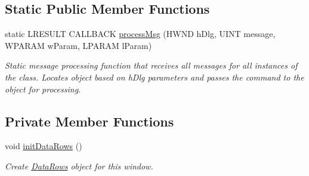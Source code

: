 \subsection*{Static Public Member Functions}
\begin{DoxyCompactItemize}
\item 
static LRESULT CALLBACK \hyperlink{class_raw_data_dialog_a3f6714a823c63a968366ddefc521daab}{processMsg} (HWND hDlg, UINT message, WPARAM wParam, LPARAM lParam)
\begin{DoxyCompactList}\small\item\em Static message processing function that receives all messages for all instances of the class. Locates object based on hDlg parameters and passes the command to the object for processing. \end{DoxyCompactList}\end{DoxyCompactItemize}
\subsection*{Private Member Functions}
\begin{DoxyCompactItemize}
\item 
void \hyperlink{class_raw_data_dialog_a3dbd1f79d05c217dfcd55a795a8b8423}{initDataRows} ()
\begin{DoxyCompactList}\small\item\em Create \hyperlink{struct_data_rows}{DataRows} object for this window. \end{DoxyCompactList}\end{DoxyCompactItemize}
